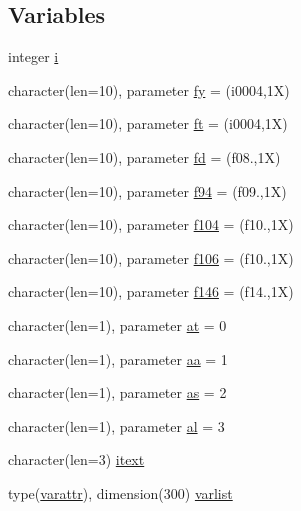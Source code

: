 \subsection*{Variables}
\begin{DoxyCompactItemize}
\item 
integer \hyperlink{namespacectrl__output_a0e436b9299ebba225dbe6a2f4eff2eed}{i}
\item 
character(len=10), parameter \hyperlink{namespacectrl__output_a250aeaca42269ac3898762523ec86e22}{fy} = \textquotesingle{}(i0004,1\+X)\textquotesingle{}
\item 
character(len=10), parameter \hyperlink{namespacectrl__output_a2b5a74f7a69e74fed45533d69b5fcf81}{ft} = \textquotesingle{}(i0004,1\+X)\textquotesingle{}
\item 
character(len=10), parameter \hyperlink{namespacectrl__output_aa27783daf4b75a43cae98a60ce884744}{fd} = \textquotesingle{}(f08.,1\+X)\textquotesingle{}
\item 
character(len=10), parameter \hyperlink{namespacectrl__output_a11f0b66275fc65047967ff8b2050ad25}{f94} = \textquotesingle{}(f09.,1\+X)\textquotesingle{}
\item 
character(len=10), parameter \hyperlink{namespacectrl__output_a8653fec4faca8b39551da13d93a3f223}{f104} = \textquotesingle{}(f10.,1\+X)\textquotesingle{}
\item 
character(len=10), parameter \hyperlink{namespacectrl__output_a191786067cffb2dc5dcfcafb12b2ead6}{f106} = \textquotesingle{}(f10.,1\+X)\textquotesingle{}
\item 
character(len=10), parameter \hyperlink{namespacectrl__output_a524b25246e690cfbc8f75fe72938fb06}{f146} = \textquotesingle{}(f14.,1\+X)\textquotesingle{}
\item 
character(len=1), parameter \hyperlink{namespacectrl__output_a18321fc13d7efb9b006ac70cece45909}{at} = \textquotesingle{}0\textquotesingle{}
\item 
character(len=1), parameter \hyperlink{namespacectrl__output_a51a0e846694f677a954a439b2d0069ce}{aa} = \textquotesingle{}1\textquotesingle{}
\item 
character(len=1), parameter \hyperlink{namespacectrl__output_a27bc52c96e692d0dbe7f6f73a3aea7e7}{as} = \textquotesingle{}2\textquotesingle{}
\item 
character(len=1), parameter \hyperlink{namespacectrl__output_a0cab13c6b1b664657d53f54bcaaf0b93}{al} = \textquotesingle{}3\textquotesingle{}
\item 
character(len=3) \hyperlink{namespacectrl__output_a4c25bfab41d6433c78b76c0a0d9c03b8}{itext}
\item 
type(\hyperlink{structctrl__output_1_1varattr}{varattr}), dimension(300) \hyperlink{namespacectrl__output_abf54926f3da30aea81f0d2ddfc9f4649}{varlist}
\end{DoxyCompactItemize}


